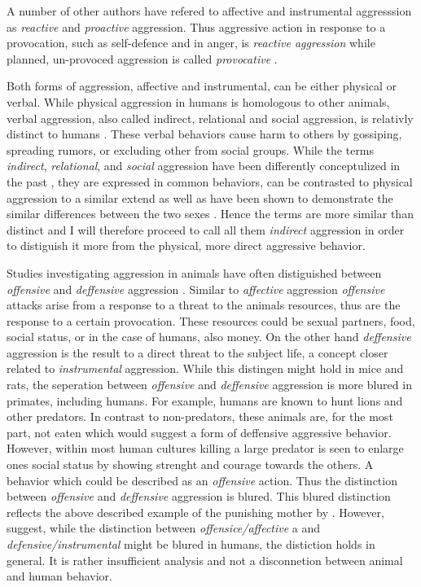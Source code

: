 A number of other authors have refered to affective and instrumental aggresssion as \textit{reactive} and \textit{proactive} aggression.
Thus aggressive action in response to a provocation, such as self-defence and in anger, is \textit{reactive aggression} while planned, un-provoced aggression is called \textit{provocative} \cite{Geen2001}.

Both forms of aggression, affective and instrumental, can be either physical or verbal.
While physical aggression in humans is homologous to other animals, verbal aggression, also called indirect, relational and social aggression, is relativly distinct to humans \cite{Archer2005}.
These verbal behaviors cause harm to others by gossiping, spreading rumors, or excluding other from social groups.
While the terms \textit{indirect}, \textit{relational}, and \textit{social} aggression have been differently conceptulized in the past \cite{Archer2001}, they are expressed in common behaviors, can be contrasted to physical aggression to a similar extend as well as have been shown to demonstrate the similar differences between the two sexes \cite{Archer2004}.
Hence the terms are more similar than distinct and I will therefore proceed to call all them \textit{indirect} aggression in order to distiguish it more from the physical, more direct aggressive behavior\cite{Archer2005}.

Studies investigating aggression in animals have often distiguished between \textit{offensive} and \textit{deffensive} aggression \cite{Blanchard2005b}.
Similar to \textit{affective} aggression \textit{offensive} attacks arise from a response to a threat to the animals resources, thus are the response to a certain provocation.
These resources could be sexual partners, food, social status, or in the case of humans, also money.
On the other hand \textit{deffensive} aggression is the result to a direct threat to the subject life, a concept closer related to \textit{instrumental} aggression.
While this distingen might hold in mice and rats, the seperation between \textit{offensive} and \textit{deffensive} aggression is more blured in primates, including humans.
For example, humans are known to hunt lions and other predators.
In contrast to non-predators, these animals are, for the most part, not eaten which would suggest a form of deffensive aggressive behavior.
However, within most human cultures killing a large predator is seen to enlarge ones social status by showing strenght and courage towards the others.
A behavior which could be described as an \textit{offensive} action.
Thus the distinction between \textit{offensive} and \textit{deffensive} aggression is blured.
This blured distinction reflects the above described example of the punishing mother by \cite{Geen2001}.
However, \cite{Blanchard2005b} suggest, while the distinction between \textit{offensice/affective} a and \textit{defensive/instrumental} might be blured in humans, the distiction holds in general.
It is rather insufficient analysis and not a disconnetion between animal and human behavior.




